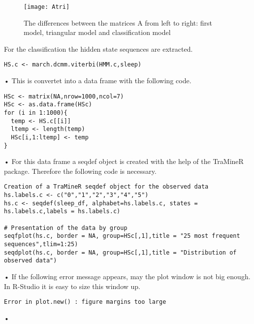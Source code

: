 \begin{figure}[h]
    \centering
    \texttt{[image: Atri]}
    \caption{The differences between the matrices A from left to right: first model, triangular model and classification model}
    \label{fig:A}
\end{figure}
For the classification the hidden state sequences are extracted.
\begin{verbatim}
HS.c <- march.dcmm.viterbi(HMM.c,sleep)
\end{verbatim}•
This is convertet into a data frame with the following code. 
\begin{verbatim}
HSc <- matrix(NA,nrow=1000,ncol=7)
HSc <- as.data.frame(HSc)
for (i in 1:1000){
  temp <- HS.c[[i]]
  ltemp <- length(temp)
  HSc[i,1:ltemp] <- temp
}
\end{verbatim}•
For this data frame a seqdef object is created with the help of the TraMineR package. Therefore the following code is necessary. 
\begin{verbatim}
Creation of a TraMineR seqdef object for the observed data
hs.labels.c <- c("0","1","2","3","4","5")
hs.c <- seqdef(sleep_df, alphabet=hs.labels.c, states = hs.labels.c,labels = hs.labels.c)

# Presentation of the data by group
seqfplot(hs.c, border = NA, group=HSc[,1],title = "25 most frequent sequences",tlim=1:25)
seqdplot(hs.c, border = NA, group=HSc[,1],title = "Distribution of observed data")
\end{verbatim}•
If the following error message appears, may the plot window is not big enough. In R-Studio it is easy to size this window up.  
\begin{verbatim}
Error in plot.new() : figure margins too large
\end{verbatim}•






